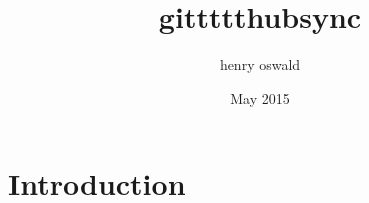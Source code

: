 \documentclass{article}
\title{gittttthubsync}
\author{henry oswald}
\date{May 2015}
\begin{document}
\maketitle

\section{Introduction}
\end{document}
